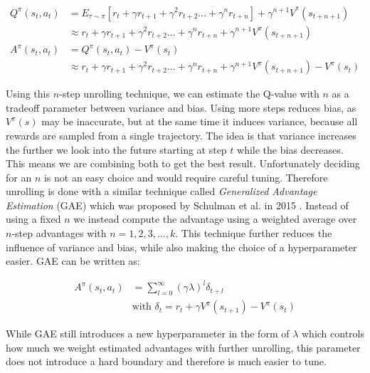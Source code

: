 \begin{align*}
Q^\pi(s_t, a_t) &= E_{\tau\sim\pi}\left[r_t + \gamma r_{t+1} + \gamma^2 r_{t+2} \dots + \gamma^n r_{t+n}\right] + \gamma^{n+1}V^*(s_{t+n+1}) \\
&\approx r_t + \gamma r_{t+1} + \gamma^2 r_{t+2} \dots + \gamma^n r_{t+n} + \gamma^{n+1}V^\pi(s_{t+n+1}) \\[15pt]
A^\pi(s_t, a_t) &= Q^\pi(s_t, a_t) - V^\pi(s_t) \\
&\approx r_t + \gamma r_{t+1} + \gamma^2 r_{t+2} \dots + \gamma^n r_{t+n} + \gamma^{n+1}V^\pi(s_{t+n+1}) - V^\pi(s_t)
\end{align*}

Using this $n$-step unrolling technique, we can estimate the Q-value with $n$ as a tradeoff parameter between variance and bias. Using more steps reduces bias, as $V^\pi(s)$ may be inaccurate, but at the same time it induces variance, because all rewards are sampled from a single trajectory. The idea is that variance increases the further we look into the future starting at step $t$ while the bias decreases. This means we are combining both to get the best result. Unfortunately deciding for an $n$ is not an easy choice and would require careful tuning. Therefore unrolling is done with a similar technique called \textit{Generalized Advantage Estimation} (GAE) which was proposed by Schulman et al. in 2015 \cite{schulman2015high}. Instead of using a fixed $n$ we instead compute the advantage using a weighted average over $n$-step advantages with $n = 1, 2, 3, \dots, k$. This technique further reduces the influence of variance and bias, while also making the choice of a hyperparameter easier. GAE can be written as:

\begin{align*}
  A^\pi(s_t, a_t) &= \sum^\infty_{l=0} (\gamma\lambda)^l \delta_{t+l} \\
  &\text{with } \delta_t = r_t + \gamma V^\pi(s_{t + 1}) - V^\pi(s_t) 
\end{align*}

While GAE still introduces a new hyperparameter in the form of $\lambda$ which controls how much we weight estimated advantages with further unrolling, this parameter does not introduce a hard boundary and therefore is much easier to tune. 

